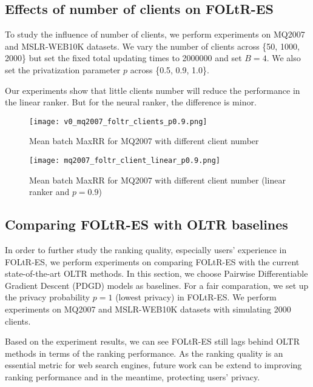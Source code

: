 \subsection{Effects of number of clients on FOLtR-ES}

To study the influence of number of clients, we perform experiments on MQ2007 and MSLR-WEB10K datasets. We vary the number of clients across \{50, 1000, 2000\} but set the fixed total updating times to 2000000 and set $B = 4$. We also set the privatization parameter $p$ across \{0.5, 0.9, 1.0\}.

Our experiments show that little clients number will reduce the performance in the linear ranker. But for the neural ranker, the difference is minor.

\begin{figure}[H]
	\centering
	\texttt{[image: v0\_mq2007\_foltr\_clients\_p0.9.png]}
	\caption{Mean batch MaxRR for MQ2007 with different client number}
	\label{fig: mq2007clients}
\end{figure}
\begin{figure}[H]
	\centering
	\texttt{[image: mq2007\_foltr\_client\_linear\_p0.9.png]}
	\caption{Mean batch MaxRR for MQ2007 with different client number (linear ranker and $p = 0.9$)}
	\label{fig: mq2007-rq2-0.9}
\end{figure}

\subsection{Comparing FOLtR-ES with OLTR baselines}

In order to further study the ranking quality, especially users' experience in FOLtR-ES, we perform experiments on comparing FOLtR-ES with the current state-of-the-art OLTR methods. In this section, we choose Pairwise Differentiable Gradient Descent (PDGD) models as baselines. For a fair comparation, we set up the privacy probability $p = 1$ (lowest privacy) in FOLtR-ES. We perform experiments on MQ2007 and MSLR-WEB10K datasets with simulating 2000 clients.

Based on the experiment results, we can see FOLtR-ES still lags behind OLTR methods in terms of the ranking performance. As the ranking quality is an essential metric for web search engines, future work can be extend to improving ranking performance and in the meantime, protecting users' privacy.

